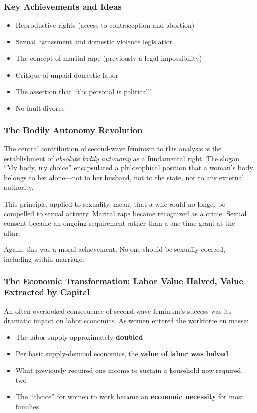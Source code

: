 \documentclass[12pt, letterpaper]{article}
\begin{document}
\subsubsection{Key Achievements and Ideas}

\begin{itemize}
    \item Reproductive rights (access to contraception and abortion)
    \item Sexual harassment and domestic violence legislation
    \item The concept of marital rape (previously a legal impossibility)
    \item Critique of unpaid domestic labor
    \item The assertion that ``the personal is political''
    \item No-fault divorce
\end{itemize}

\subsubsection{The Bodily Autonomy Revolution}

The central contribution of second-wave feminism to this analysis is the establishment of \textit{absolute bodily autonomy} as a fundamental right. The slogan ``My body, my choice'' encapsulated a philosophical position that a woman's body belongs to her alone---not to her husband, not to the state, not to any external authority.

This principle, applied to sexuality, meant that a wife could no longer be compelled to sexual activity. Marital rape became recognized as a crime. Sexual consent became an ongoing requirement rather than a one-time grant at the altar.

Again, this was a moral achievement. No one should be sexually coerced, including within marriage.

\subsubsection{The Economic Transformation: Labor Value Halved, Value Extracted by Capital}

An often-overlooked consequence of second-wave feminism's success was its dramatic impact on labor economics. As women entered the workforce en masse:

\begin{itemize}
    \item The labor supply approximately \textbf{doubled}
    \item Per basic supply-demand economics, the \textbf{value of labor was halved}
    \item What previously required one income to sustain a household now required two
    \item The ``choice'' for women to work became an \textbf{economic necessity} for most families
\end{itemize}
\end{document}
